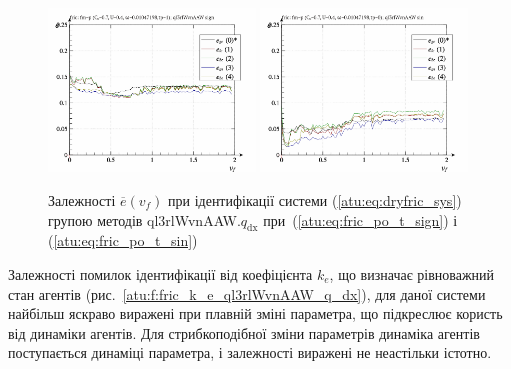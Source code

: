 \begin{figure}[htb!]
  \centerline{
    \includegraphics[width=0.49\textwidth]{p/cha/fric/ql3rlWvnAAW/fric_id-p_v_f_sign.png}
    \hfill
    \includegraphics[width=0.49\textwidth]{p/cha/fric/ql3rlWvnAAW/fric_id-p_v_f_sin.png}
  }
\caption{Залежності $ \overline{e} (v_f) $ при ідентифікації системи (\ref{atu:eq:dryfric_sys}) групою методів ql3rlWvnAAW.$q_\mathrm{dx} $ при~(\ref{atu:eq:fric_po_t_sign}) і (\ref{atu:eq:fric_po_t_sin})}
\label{atu:f:fric_v_f_ql3rlWvnAAW_q_dx}
\end{figure}

Залежності помилок ідентифікації від коефіцієнта
$ k_e $, що визначає рівноважний стан агентів
(рис.~\ref{atu:f:fric_k_e_ql3rlWvnAAW_q_dx}), для даної системи найбільш яскраво
виражені при плавній зміні параметра, що підкреслює користь
від динаміки агентів. Для стрибкоподібної зміни параметрів
динаміка агентів поступається динаміці параметра, і залежності
виражені не неастільки істотно.

